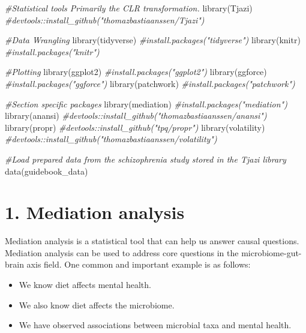 \documentclass[
]{article}
\newenvironment{Shaded}{\begin{snugshade}}{\end{snugshade}}
\newcommand{\CommentTok}[1]{\textcolor[rgb]{0.56,0.35,0.01}{\textit{#1}}}
\newcommand{\FunctionTok}[1]{\textcolor[rgb]{0.00,0.00,0.00}{#1}}
\newcommand{\NormalTok}[1]{#1}
\providecommand{\tightlist}{%
  \setlength{\itemsep}{0pt}\setlength{\parskip}{0pt}}
\begin{document}
\begin{Shaded}
\begin{Highlighting}[]
\CommentTok{\#Statistical tools        Primarily the CLR transformation.}
\FunctionTok{library}\NormalTok{(Tjazi)            }\CommentTok{\#devtools::install\_github("thomazbastiaanssen/Tjazi")}

\CommentTok{\#Data Wrangling}
\FunctionTok{library}\NormalTok{(tidyverse)        }\CommentTok{\#install.packages("tidyverse")}
\FunctionTok{library}\NormalTok{(knitr)            }\CommentTok{\#install.packages("knitr")}

\CommentTok{\#Plotting}
\FunctionTok{library}\NormalTok{(ggplot2)          }\CommentTok{\#install.packages("ggplot2")}
\FunctionTok{library}\NormalTok{(ggforce)          }\CommentTok{\#install.packages("ggforce")}
\FunctionTok{library}\NormalTok{(patchwork)        }\CommentTok{\#install.packages("patchwork")}

\CommentTok{\#Section specific packages}
\FunctionTok{library}\NormalTok{(mediation)        }\CommentTok{\#install.packages("mediation")}
\FunctionTok{library}\NormalTok{(anansi)           }\CommentTok{\#devtools::install\_github("thomazbastiaanssen/anansi")}
\FunctionTok{library}\NormalTok{(propr)            }\CommentTok{\#devtools::install\_github("tpq/propr")}
\FunctionTok{library}\NormalTok{(volatility)       }\CommentTok{\#devtools::install\_github("thomazbastiaanssen/volatility")}


\CommentTok{\#Load prepared data from the schizophrenia study stored in the Tjazi library}
\FunctionTok{data}\NormalTok{(guidebook\_data)}
\end{Highlighting}
\end{Shaded}

\newpage

\hypertarget{mediation-analysis}{%
\section{1. Mediation analysis}\label{mediation-analysis}}

Mediation analysis is a statistical tool that can help us answer causal
questions. Mediation analysis can be used to address core questions in
the microbiome-gut-brain axis field. One common and important example is
as follows:

\begin{itemize}
\tightlist
\item
  We know diet affects mental health.
\item
  We also know diet affects the microbiome.
\item
  We have observed associations between microbial taxa and mental
  health.
\end{itemize}
\end{document}
